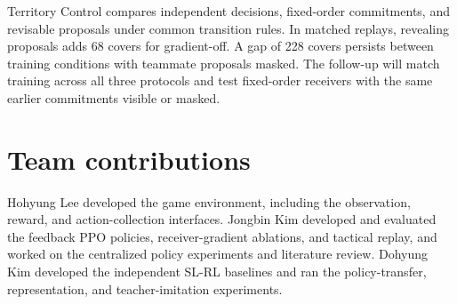 \documentclass{article}
\begin{document}
Territory Control compares independent decisions, fixed-order commitments, and revisable proposals under common transition rules. In matched replays, revealing proposals adds 68 covers for gradient-off. A gap of 228 covers persists between training conditions with teammate proposals masked. The follow-up will match training across all three protocols and test fixed-order receivers with the same earlier commitments visible or masked.

\section{Team contributions}

Hohyung Lee developed the game environment, including the observation, reward, and action-collection interfaces. Jongbin Kim developed and evaluated the feedback PPO policies, receiver-gradient ablations, and tactical replay, and worked on the centralized policy experiments and literature review. Dohyung Kim developed the independent SL-RL baselines and ran the policy-transfer, representation, and teacher-imitation experiments.

\clearpage
\begingroup
\small


\endgroup
\end{document}
